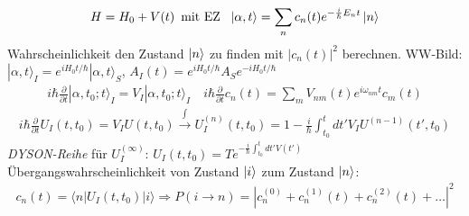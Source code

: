 




{\Huge
\begin{align*}
  H=H_0+V(t)\,\text{ mit EZ } \,\, \left| \alpha,t \right\rangle =\sum_n c_n(t) e^{-\frac{i}{\hbar}E_nt} \left| n \right\rangle 
\end{align*}
 Wahrscheinlichkeit den Zustand \(\left| n \right\rangle\) zu finden mit \(|c_n(t)|^2\) berechnen.
WW-Bild: \(|\alpha,t\rangle_I = e^{iH_0t/\hbar}|\alpha,t\rangle_S\), \(  A_I(t) =  e^{iH_0t/\hbar} A_S e^{-iH_0t/\hbar}\)
\begin{align*}
    \boxed{i\hbar \frac{\partial}{\partial t} |\alpha,t_0;t\rangle_I = V_I|\alpha,t_0;t\rangle_I} \quad \boxed{i\hbar \frac{\partial}{\partial t}c_n(t) = \sum_m V_{nm}(t) e^{i\omega_{nm}t}c_m(t)}
\end{align*}
\begin{align*}
  i\hbar  \frac{\partial}{\partial t}U_I(t,t_0) = V_IU(t,t_0) \stackrel{\int}\to  U_I^{(n)}(t,t_0) = 1 - \frac{i}{\hbar} \int_{t_0}^{t}dt' V_IU^{(n-1)}(t',t_0)
\end{align*}
\textit{DYSON-Reihe} für \(U_I^{(\infty)}\): \(U_I(t,t_0) =Te^{-\frac{i}{\hbar} \int_{t_0}^t dt' V(t')}\)\\
Übergangswahrscheinlichkeit von Zustand \(\left| i \right\rangle\) zum Zustand \(\left| n \right\rangle\):
\begin{align*}
  c_n(t) = \langle n|U_I(t,t_0)|i\rangle  \Rightarrow   \boxed{P(i\rightarrow n) = |c^{(0)}_n + c_n^{(1)}(t)+c_n^{(2)}(t)+\dots|^2}
\end{align*}

}%

